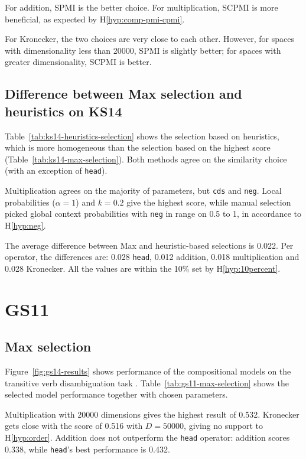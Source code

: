 For addition, SPMI is the better choice. For multiplication, SCPMI is more beneficial, as expected by H\ref{hyp:comp-pmi-cpmi}.

For Kronecker, the two choices are very close to each other. However, for spaces with dimensionality less than 20000, SPMI is slightly better; for spaces with greater dimensionality, SCPMI is better.

\subsection{Difference between Max selection and heuristics on KS14}

Table~\ref{tab:ks14-heuristics-selection} shows the selection based on heuristics, which is more homogeneous than the selection based on the highest score (Table~\ref{tab:ks14-max-selection}). Both methods agree on the similarity choice (with an exception of \texttt{head}).

Multiplication agrees on the majority of parameters, but \texttt{cds} and \texttt{neg}. Local probabilities ($\alpha = 1$) and $k = 0.2$ give the highest score, while manual selection picked global context probabilities with \texttt{neg} in range on 0.5 to 1, in accordance to H\ref{hyp:neg}.

The average difference between Max and heuristic-based selections is 0.022. Per operator, the differences are: 0.028 \texttt{head}, 0.012 addition, 0.018 multiplication and 0.028 Kronecker. All the values are within the 10\% set by H\ref{hyp:10percent}.

\section{GS11}
\label{sec:gs11}


\subsection{Max selection}
\label{sec:max-selection-gs11}



Figure~\ref{fig:gs14-results} shows performance of the compositional models on the transitive verb disambiguation task \cite{Grefenstette:2011:ESC:2145432.2145580}. Table~\ref{tab:gs11-max-selection} shows the selected model performance together with chosen parameters.

Multiplication with 20000 dimensions gives the highest result of 0.532. Kronecker gets close with the score of 0.516 with $D = 50000$, giving no support to H\ref{hyp:order}. Addition does not outperform the \texttt{head} operator: addition scores 0.338, while \texttt{head}'s best performance is 0.432.

